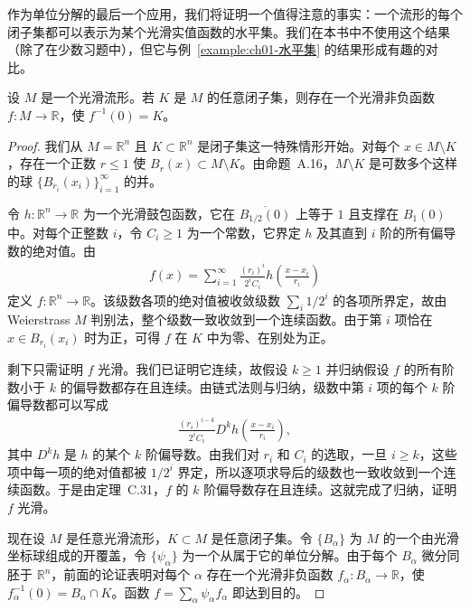 \documentclass[../../main.tex]{subfiles}
\begin{document}
作为单位分解的最后一个应用，我们将证明一个值得注意的事实：一个流形的每个闭子集都可以表示为某个光滑实值函数的水平集。我们在本书中不使用这个结果（除了在少数习题中），但它与例~\cref{example:ch01-水平集} 的结果形成有趣的对比。

\begin{theorem}[光滑函数的水平集]\label{theorem:ch02-光滑函数水平集}
设 $M$ 是一个光滑流形。若 $K$ 是 $M$ 的任意闭子集，则存在一个光滑非负函数 $f:M\to\mathbb{R}$，使 $f^{-1}(0)=K$。
\end{theorem}

\begin{proof}
我们从 $M=\mathbb{R}^{n}$ 且 $K\subset\mathbb{R}^{n}$ 是闭子集这一特殊情形开始。对每个 $x\in M\setminus K$，存在一个正数 $r\leqslant 1$ 使 $B_{r}(x)\subset M\setminus K$。由命题~A.16，$M\setminus K$ 是可数多个这样的球 $\{B_{r_{i}}(x_{i})\}_{i=1}^{\infty}$ 的并。

令 $h:\mathbb{R}^{n}\to\mathbb{R}$ 为一个光滑鼓包函数，它在 $\overline{B_{1/2}(0)}$ 上等于 $1$ 且支撑在 $B_{1}(0)$ 中。对每个正整数 $i$，令 $C_{i}\geqslant 1$ 为一个常数，它界定 $h$ 及其直到 $i$ 阶的所有偏导数的绝对值。由
\begin{align*}
f(x)=\sum_{i=1}^{\infty}\frac{(r_{i})^{i}}{2^{i}C_{i}}h\left(\frac{x-x_{i}}{r_{i}}\right)
\end{align*}
定义 $f:\mathbb{R}^{n}\to\mathbb{R}$。该级数各项的绝对值被收敛级数 $\sum_{i}1/2^{i}$ 的各项所界定，故由 Weierstrass $M$ 判别法，整个级数一致收敛到一个连续函数。由于第 $i$ 项恰在 $x\in B_{r_{i}}(x_{i})$ 时为正，可得 $f$ 在 $K$ 中为零、在别处为正。

剩下只需证明 $f$ 光滑。我们已证明它连续，故假设 $k\geqslant 1$ 并归纳假设 $f$ 的所有阶数小于 $k$ 的偏导数都存在且连续。由链式法则与归纳，级数中第 $i$ 项的每个 $k$ 阶偏导数都可以写成
\begin{align*}
\frac{(r_{i})^{i-k}}{2^{i}C_{i}}D^{k}h\left(\frac{x-x_{i}}{r_{i}}\right),
\end{align*}
其中 $D^{k}h$ 是 $h$ 的某个 $k$ 阶偏导数。由我们对 $r_{i}$ 和 $C_{i}$ 的选取，一旦 $i\geqslant k$，这些项中每一项的绝对值都被 $1/2^{i}$ 界定，所以逐项求导后的级数也一致收敛到一个连续函数。于是由定理~C.31，$f$ 的 $k$ 阶偏导数存在且连续。这就完成了归纳，证明 $f$ 光滑。

现在设 $M$ 是任意光滑流形，$K\subset M$ 是任意闭子集。令 $\{B_{\alpha}\}$ 为 $M$ 的一个由光滑坐标球组成的开覆盖，令 $\{\psi_{\alpha}\}$ 为一个从属于它的单位分解。由于每个 $B_{\alpha}$ 微分同胚于 $\mathbb{R}^{n}$，前面的论证表明对每个 $\alpha$ 存在一个光滑非负函数 $f_{\alpha}:B_{\alpha}\to\mathbb{R}$，使 $f_{\alpha}^{-1}(0)=B_{\alpha}\cap K$。函数 $f=\sum_{\alpha}\psi_{\alpha}f_{\alpha}$ 即达到目的。
\end{proof}
\end{document}
